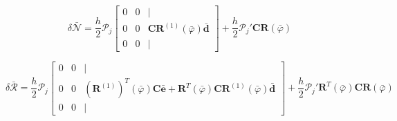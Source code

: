 \documentclass{article}
\newcommand{\dep}[1]{{\scriptstyle(#1)}}
\begin{document}
$$\delta\bar{\mathcal{N}} = \frac{h}{2}\mathcal{P}_j
\begin{bmatrix}
0 & 0 & | \\
0 & 0 & \mathbf{CR}^{(1)}\dep{\bar{\varphi}}\bar{\mathbf{d}} \\
0 & 0 & |
\end{bmatrix} + \frac{h}{2}\mathcal{P}_j' \mathbf{CR}\dep{\bar{\varphi}}$$

$$\delta\bar{\mathcal{R}} = \frac{h}{2}\mathcal{P}_j
\begin{bmatrix}
0 & 0 & | \\
0 & 0 & (\mathbf{R}^{(1)})^T\dep{\bar{\varphi}}\mathbf{C}\bar{\mathbf{e}} + \mathbf{R}^T\dep{\bar{\varphi}}\mathbf{CR}^{(1)}\dep{\bar{\varphi}}\bar{\mathbf{d}} \\
0 & 0 & |
\end{bmatrix} + \frac{h}{2}\mathcal{P}_j' \mathbf{R}^T\dep{\bar{\varphi}} \mathbf{CR}\dep{\bar{\varphi}}$$
\end{document}
